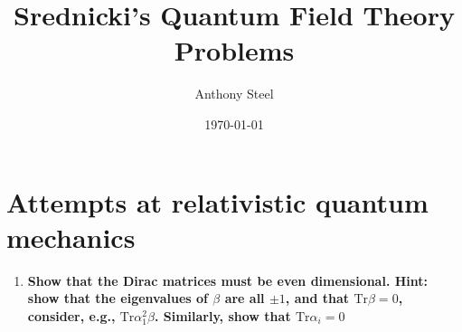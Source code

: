 \documentclass[9pt]{report}
\begin{document}
\title{Srednicki's Quantum Field Theory\protect\\ Problems}
\author{Anthony Steel}
\date{\today}
\maketitle
\chapter{Attempts at relativistic quantum mechanics}
\begin{enumerate}
  \item
  \textbf{Show that the Dirac matrices must be even dimensional. Hint: show that
  the eigenvalues of $\beta$ are all $\pm1$, and that $\text{Tr}\beta = 0$, consider,
e.g., $\text{Tr}\alpha^2_1\beta$. Similarly, show that $\text{Tr}\alpha_i=0$}


\end{enumerate}
\end{document}
